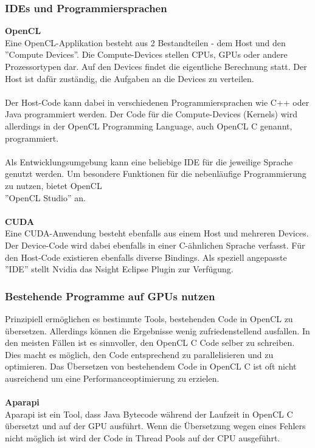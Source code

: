 \subsubsection{IDEs und Programmiersprachen}
\textbf{OpenCL}\\
Eine OpenCL-Applikation besteht aus 2 Bestandteilen - dem Host und den ''Compute Devices''. Die Compute-Devices stellen CPUs, GPUs oder andere Prozessortypen dar. Auf den Devices findet die eigentliche Berechnung statt. Der Host ist dafür zuständig, die Aufgaben an die Devices zu verteilen. \cite{openclprogramming_munshi} \\\\
Der Host-Code kann dabei in verschiedenen Programmiersprachen wie C++ oder Java programmiert werden. Der Code für die Compute-Devices (Kernels) wird allerdings in der OpenCL Programming Language, auch OpenCL C genannt, programmiert. \cite{openclprogramming_munshi}\\\\
Als Entwicklungsumgebung kann eine beliebige IDE für die jeweilige Sprache genutzt werden. Um besondere Funktionen für die nebenläufige Programmierung zu nutzen, bietet OpenCL \\''OpenCL Studio'' an. \cite[S. 12]{openclstudio} \\\\
\textbf{CUDA}\\
Eine CUDA-Anwendung besteht ebenfalls aus einem Host und mehreren Devices. Der Device-Code wird dabei ebenfalls in einer C-ähnlichen Sprache verfasst. Für den Host-Code existieren ebenfalls diverse Bindings. \cite[S. 41]{programminggpgpu_kirk} Als speziell angepasste ''IDE'' stellt Nvidia das Nsight Eclipse Plugin zur Verfügung. \cite{nsighteclipse}

\subsubsection{Bestehende Programme auf GPUs nutzen}
Prinzipiell ermöglichen es bestimmte Tools, bestehenden Code in OpenCL zu übersetzen. Allerdings können die Ergebnisse wenig zufriedenstellend ausfallen. In den meisten Fällen ist es sinnvoller, den OpenCL C Code selber zu schreiben. Dies macht es möglich, den Code entsprechend zu parallelisieren und zu optimieren. Das Übersetzen von bestehendem Code in OpenCL C ist oft nicht ausreichend um eine Performanceoptimierung zu erzielen.\\\\
\textbf{Aparapi}\\
Aparapi ist ein Tool, dass Java Bytecode während der Laufzeit in OpenCL C übersetzt und auf der GPU ausführt. Wenn die Übersetzung wegen eines Fehlers nicht möglich ist wird der Code in Thread Pools auf der CPU ausgeführt.\cite{aparapi}

